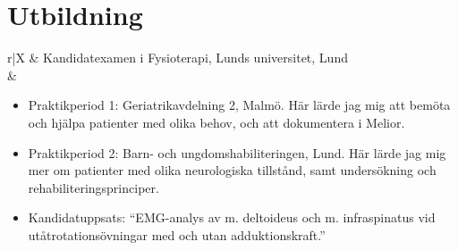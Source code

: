 \documentclass[11pt,a4paper]{article}
\begin{document}
\section{Utbildning}
\hspace{-4pt}
\begin{tabularx}{\textwidth}{r|X}	
	& Kandidatexamen i Fysioterapi, Lunds universitet, Lund\\
	&\footnotesize{\vspace{-5pt}
		 \begin{itemize}[leftmargin=10pt, topsep=-12.5pt]

		\item Praktikperiod 1: Geriatrikavdelning 2, Malmö. Här lärde jag mig att bemöta och hjälpa patienter med olika behov, och att dokumentera i Melior.
		\item Praktikperiod 2: Barn- och ungdomshabiliteringen, Lund. Här lärde jag mig mer om patienter med olika neuro\-logiska tillstånd, samt undersökning och rehabiliteringsprinciper.
		\item Kandidatuppsats: ``EMG-analys av m. deltoideus och m. infraspinatus vid utåt\-rotations\-övningar med och utan adduktionskraft.''
		\end{itemize}\vspace{-30pt} 
	}\\
	 \\
\end{tabularx}

\end{document}
